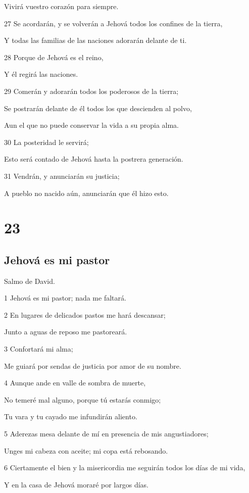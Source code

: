 \par Vivirá vuestro corazón para siempre.
\par 27 Se acordarán, y se volverán a Jehová todos los confines de la tierra,
\par Y todas las familias de las naciones adorarán delante de ti.
\par 28 Porque de Jehová es el reino,
\par Y él regirá las naciones.
\par 29 Comerán y adorarán todos los poderosos de la tierra;
\par Se postrarán delante de él todos los que descienden al polvo,
\par Aun el que no puede conservar la vida a su propia alma.
\par 30 La posteridad le servirá;
\par Esto será contado de Jehová hasta la postrera generación.
\par 31 Vendrán, y anunciarán su justicia;
\par A pueblo no nacido aún, anunciarán que él hizo esto.

\chapter{23}

\section*{Jehová es mi pastor}

\par Salmo de David.

\par 1 Jehová es mi pastor; nada me faltará.
\par 2 En lugares de delicados pastos me hará descansar;
\par Junto a aguas de reposo me pastoreará.
\par 3 Confortará mi alma;
\par Me guiará por sendas de justicia por amor de su nombre.
\par 4 Aunque ande en valle de sombra de muerte,
\par No temeré mal alguno, porque tú estarás conmigo;
\par Tu vara y tu cayado me infundirán aliento.
\par 5 Aderezas mesa delante de mí en presencia de mis angustiadores;
\par Unges mi cabeza con aceite; mi copa está rebosando.
\par 6 Ciertamente el bien y la misericordia me seguirán todos los días de mi vida,
\par Y en la casa de Jehová moraré por largos días.


